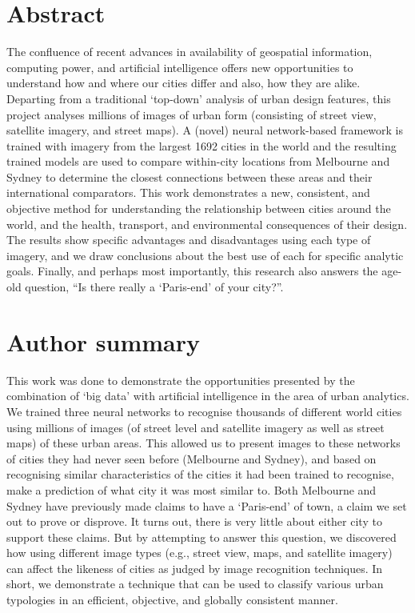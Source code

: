 \documentclass[10pt,letterpaper]{article}
\begin{document}
\section*{Abstract}
The confluence of recent advances in availability of geospatial information, computing power, and artificial intelligence offers new opportunities to understand how and where our cities differ and also, how they are alike. Departing from a traditional `top-down' analysis of urban design features, this project analyses millions of images of urban form (consisting of street view, satellite imagery, and street maps). A (novel) neural network-based framework is trained with imagery from the largest 1692 cities in the world and the resulting trained models are used to compare within-city locations from Melbourne and Sydney to determine the closest connections between these areas and their international comparators. This work demonstrates a new, consistent, and objective method for understanding the relationship between cities around the world, and the health, transport, and environmental consequences of their design. The results show specific advantages and disadvantages using each type of imagery, and we draw conclusions about the best use of each for specific analytic goals. Finally, and perhaps most importantly, this research also answers the age-old question, ``Is there really a `Paris-end' of your city?''.


\section*{Author summary}
This work was done to demonstrate the opportunities presented by the combination of `big data' with artificial intelligence in the area of urban analytics. We trained three neural networks to recognise thousands of different world cities using millions of images (of street level and satellite imagery as well as street maps) of these urban areas. This allowed us to present images to these networks of cities they had never seen before (Melbourne and Sydney), and based on recognising similar characteristics of the cities it had been trained to recognise, make a prediction of what city it was most similar to. Both Melbourne and Sydney have previously made claims to have a `Paris-end' of town, a claim we set out to prove or disprove. It turns out, there is very little about either city to support these claims. But by attempting to answer this question, we discovered how using different image types (e.g., street view, maps, and satellite imagery) can affect the likeness of cities as judged by image recognition techniques. In short, we demonstrate a technique that can be used to classify various urban typologies in an efficient, objective, and globally consistent manner.
\end{document}
